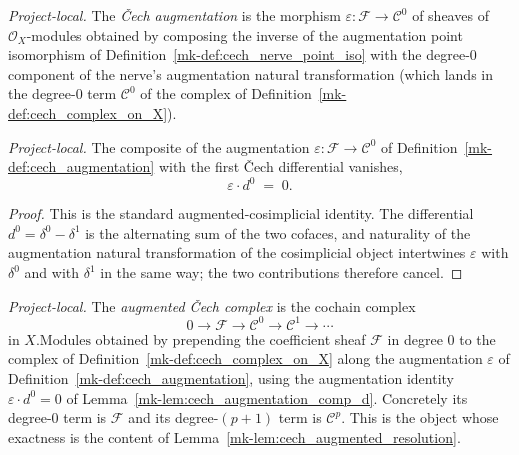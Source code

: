 \begin{definition}\label{mk-def:cech_augmentation}
  \leanok

  \textit{Project-local.}
  The \emph{{\v C}ech augmentation} is the morphism \(\varepsilon : \mathcal{F} \to \mathcal{C}^0\) of
  sheaves of \(\mathcal{O}_X\)-modules obtained by composing the inverse of the augmentation point
  isomorphism of Definition~\ref{mk-def:cech_nerve_point_iso} with the degree-\(0\) component of the
  nerve's augmentation natural transformation (which lands in the degree-\(0\) term \(\mathcal{C}^0\) of
  the complex of Definition~\ref{mk-def:cech_complex_on_X}).
\end{definition}

\begin{lemma}
  \label{mk-lem:cech_augmentation_comp_d}

  \textit{Project-local.}
  The composite of the augmentation \(\varepsilon : \mathcal{F} \to \mathcal{C}^0\) of
  Definition~\ref{mk-def:cech_augmentation} with the first {\v C}ech differential vanishes,
  \[
    \varepsilon \cdot d^0 \;=\; 0.
  \]
\end{lemma}
\begin{proof}
  This is the standard augmented-cosimplicial identity. The differential \(d^0 = \delta^0 - \delta^1\)
  is the alternating sum of the two cofaces, and naturality of the augmentation natural transformation
  of the cosimplicial object intertwines \(\varepsilon\) with \(\delta^0\) and with \(\delta^1\) in the
  same way; the two contributions therefore cancel.
\end{proof}

\begin{definition}\label{mk-def:cech_augmented_complex}
  \leanok

  \textit{Project-local.}
  The \emph{augmented {\v C}ech complex} is the cochain complex
  \[
    0 \to \mathcal{F} \to \mathcal{C}^0 \to \mathcal{C}^1 \to \cdots
  \]
  in \(X.\mathrm{Modules}\) obtained by prepending the coefficient sheaf \(\mathcal{F}\) in degree \(0\)
  to the complex of Definition~\ref{mk-def:cech_complex_on_X} along the augmentation
  \(\varepsilon\) of Definition~\ref{mk-def:cech_augmentation}, using the augmentation identity
  \(\varepsilon \cdot d^0 = 0\) of Lemma~\ref{mk-lem:cech_augmentation_comp_d}. Concretely its degree-\(0\)
  term is \(\mathcal{F}\) and its degree-\((p+1)\) term is \(\mathcal{C}^p\). This is the object whose
  exactness is the content of Lemma~\ref{mk-lem:cech_augmented_resolution}.
\end{definition}

